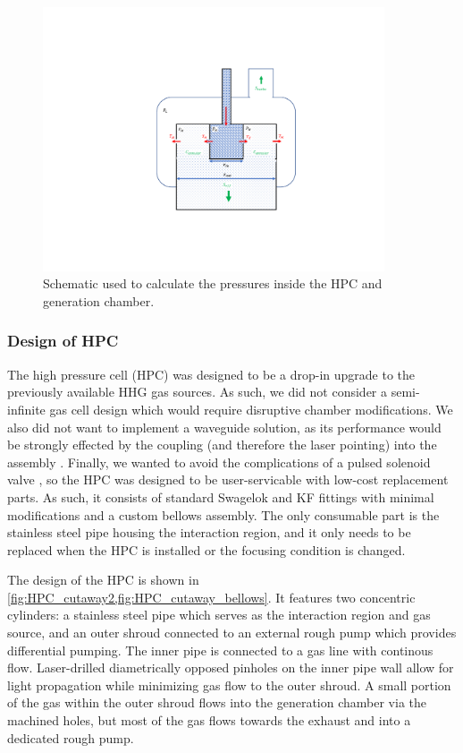 \begin{figure}
	\centering
	\includegraphics[width=0.9\textwidth]{figures/chap3/HPC_pressure_schematic.pdf}
	\caption{Schematic used to calculate the pressures inside the HPC and generation chamber.}
	\label{fig:HPC_pressure_schematic}
\end{figure}

\subsubsection{Design of HPC}

The high pressure cell (HPC) was designed to be a drop-in upgrade to the previously available HHG gas sources. As such, we did not consider a semi-infinite gas cell design which would require disruptive chamber modifications. We also did not want to implement a waveguide solution, as its performance would be strongly effected by the coupling (and therefore the laser pointing) into the assembly \cite{popmintchevExtendedPhaseMatching2008,popmintchevPhaseMatchingHigh2009}. Finally, we wanted to avoid the complications of a pulsed solenoid valve \cite{evenEvenLavieValveSource2015}, so the HPC was designed to be user-servicable with low-cost replacement parts. As such, it consists of standard Swagelok and KF fittings with minimal modifications and a custom bellows assembly. The only consumable part is the stainless steel pipe housing the interaction region, and it only needs to be replaced when the HPC is installed or the focusing condition is changed.

The design of the HPC is shown in \cref{fig:HPC_cutaway2,fig:HPC_cutaway_bellows}. It features two concentric cylinders: a stainless steel pipe which serves as the interaction region and gas source, and an outer shroud connected to an external rough pump which provides differential pumping. The inner pipe is connected to a gas line with continous flow. Laser-drilled diametrically opposed pinholes on the inner pipe wall allow for light propagation while minimizing gas flow to the outer shroud. A small portion of the gas within the outer shroud flows into the generation chamber via the machined holes, but most of the gas flows towards the exhaust and into a dedicated rough pump.

